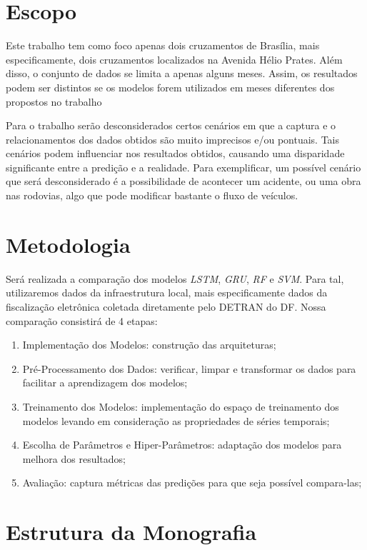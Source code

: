 \section{Escopo}

Este trabalho tem como foco apenas dois cruzamentos de Brasília, mais especificamente, dois cruzamentos localizados na Avenida Hélio Prates. Além disso, o conjunto de dados se limita a apenas alguns meses. Assim, os resultados podem ser distintos se os modelos forem utilizados em meses diferentes dos propostos no trabalho

Para o trabalho serão desconsiderados certos cenários em que a captura e o relacionamentos dos dados obtidos são muito imprecisos e/ou pontuais. Tais cenários podem influenciar nos resultados obtidos, causando uma disparidade significante entre a predição e a realidade. Para exemplificar, um possível cenário que será desconsiderado é a possibilidade de acontecer um acidente, ou uma obra nas rodovias, algo que pode modificar bastante o fluxo de veículos.

\section{Metodologia}

Será realizada a comparação dos modelos  \textit{\acrshort{LSTM}}, \textit{\acrshort{GRU}}, \textit{\acrshort{RF}} e \textit{\acrshort{SVM}}. Para tal, utilizaremos dados da infraestrutura local, mais especificamente dados da fiscalização eletrônica coletada diretamente pelo \acrfull{DETRAN} do \acrfull{DF}. Nossa comparação consistirá de 4 etapas:

\begin{enumerate}
    \item Implementação dos Modelos: construção das arquiteturas;
    \item Pré-Processamento dos Dados: verificar, limpar e transformar os dados para facilitar a aprendizagem dos modelos;
    \item Treinamento dos Modelos: implementação do espaço de treinamento dos modelos levando em consideração as propriedades de séries temporais;
    \item Escolha de Parâmetros e Hiper-Parâmetros: adaptação dos modelos para melhora dos resultados;
    \item Avaliação: captura métricas das predições para que seja possível compara-las;
\end{enumerate}

\section{Estrutura da Monografia}

